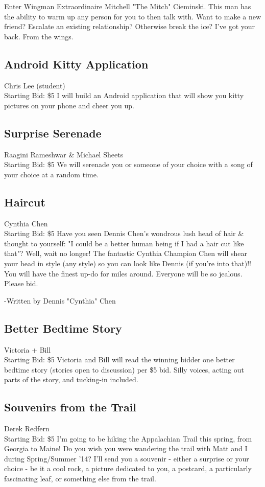 \documentclass[11pt]{article}
\begin{document}
Enter Wingman Extraordinaire Mitchell "The Mitch" Cieminski. This man has the ability to warm up any person for you to then talk with. Want to make a new friend? Escalate an existing relationship? Otherwise break the ice? I've got your back. From the wings.
\subsection{Android Kitty Application}
Chris Lee (student)
\\
Starting Bid: \$5
\newline
I will build an Android application that will show you kitty pictures on your phone and cheer you up.
\subsection{Surprise Serenade}
Raagini Rameshwar \& Michael Sheets
\\
Starting Bid: \$5
\newline
We will serenade you or someone of your choice with a song of your choice at a random time.
\subsection{Haircut}
Cynthia Chen
\\
Starting Bid: \$5
\newline
Have you seen Dennis Chen's wondrous lush head of hair \& thought to yourself: "I could be a better human being if I had a hair cut like that"? Well, wait no longer! The fantastic Cynthia Champion Chen will shear your head in style (any style) so you can look like Dennis (if you're into that)!! You will have the finest up-do for miles around. Everyone will be so jealous. Please bid.

-Written by Dennis "Cynthia" Chen
\subsection{Better Bedtime Story}
Victoria + Bill
\\
Starting Bid: \$5
\newline
Victoria and Bill will read the winning bidder one better bedtime story (stories open to discussion) per \$5 bid. Silly voices, acting out parts of the story, and tucking-in included.
\subsection{Souvenirs from the Trail}
Derek Redfern
\\
Starting Bid: \$5
\newline
I'm going to be hiking the Appalachian Trail this spring, from Georgia to Maine! Do you wish you were wandering the trail with Matt and I during Spring/Summer '14? I'll send you a souvenir - either a surprise or your choice - be it a cool rock, a picture dedicated to you, a postcard, a particularly fascinating leaf, or something else from the trail.
\end{document}
